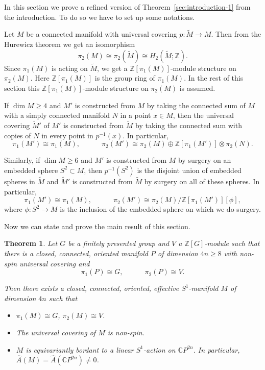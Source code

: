 \documentclass[a4paper, 11pt]{amsart}
\newtheorem{theorem}{Theorem}[section]
\theoremstyle{definition}
\theoremstyle{remark}
\numberwithin{equation}{section}
\begin{document}
In this section we prove a refined version of Theorem~\ref{sec:introduction-1} from the introduction.
To do so we have to set up some notations.

Let \(M\) be a connected manifold with universal covering \(p:\tilde{M}\rightarrow M\).
Then from the Hurewicz theorem we get an isomorphism
\[\pi_2(M)\cong\pi_2(\tilde{M})\cong H_2(\tilde{M};\mathbb{Z}).\]
Since \(\pi_1(M)\) is acting on \(\tilde{M}\), we get a \(\mathbb{Z}[\pi_1(M)]\)-module structure on \(\pi_2(M)\).
Here \(\mathbb{Z}[\pi_1(M)]\) is the group ring of \(\pi_1(M)\).
In the rest of this section this \(\mathbb{Z}[\pi_1(M)]\)-module structure on \(\pi_2(M)\) is assumed.

If \(\dim M\geq 4\) and \(M'\) is constructed from \(M\) by taking the connected sum of \(M\) with a simply connected manifold \(N\) in a point \(x\in M\), then the universal covering  \(\tilde{M}'\) of \(M'\) is constructed from \(\tilde{M}\) by taking the connected sum with copies of \(N\) in every point in \(p^{-1}(x)\).
In particular,
\[\pi_1(M')\cong \pi_1(M),\quad\quad\quad \pi_2(M')\cong \pi_2(M)\oplus \mathbb{Z}[\pi_1(M')]\otimes \pi_2(N).\]

Similarly, if \(\dim M\geq 6\) and \(M'\) is constructed from \(M\) by surgery on an embedded sphere \(S^2\subset M\), then \(p^{-1}(S^2)\) is the disjoint union of embedded spheres in \(\tilde{M}\) and \(\tilde{M}'\) is constructed from \(\tilde{M}\) by surgery  on all of these spheres.
In particular,
\[\pi_1(M')\cong \pi_1(M),\quad\quad\quad \pi_2(M')\cong \pi_2(M)/\mathbb{Z}[\pi_1(M')][\phi],\]
where \(\phi:S^2\rightarrow M\) is the inclusion of the embedded sphere on which we do surgery.

Now we can state and prove the main result of this section.

\begin{theorem}
  \label{sec:equivariant-surgery-3}
  Let \(G\) be a finitely presented group and \(V\) a \(\mathbb{Z}[G]\)-module such that there is a closed, connected, oriented manifold \(P\) of dimension \(4n\geq 8\) with non-spin universal covering and
  \begin{equation}
    \label{eq:3}
\pi_1(P)\cong G,\quad\quad\quad \pi_2(P)\cong V.
\end{equation}

  Then there exists a closed, connected, oriented, effective \(S^1\)-manifold \(M\) of dimension \(4n\) such that
  \begin{itemize}
  \item \(\pi_1(M)\cong G\), \(\pi_2(M)\cong V\).
  \item The universal covering of \(M\) is non-spin.
  \item \(M\) is equivariantly bordant to a linear \(S^1\)-action on \(\mathbb{C} P^{2n}\). In particular, \(\hat{A}(M)=\hat{A}(\mathbb{C} P^{2n})\neq 0\).
  \end{itemize}
\end{theorem}
\end{document}
